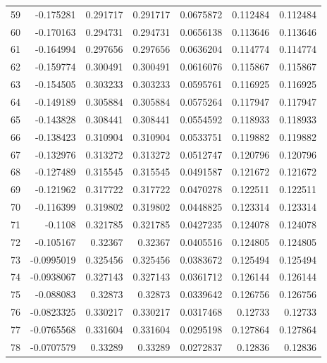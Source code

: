 \begin{tabular}{rrrrrrr}
  59 & -0.175281    & 0.291717    & 0.291717    &  0.0675872   & 0.112484    & 0.112484    \\
  60 & -0.170163    & 0.294731    & 0.294731    &  0.0656138   & 0.113646    & 0.113646    \\
  61 & -0.164994    & 0.297656    & 0.297656    &  0.0636204   & 0.114774    & 0.114774    \\
  62 & -0.159774    & 0.300491    & 0.300491    &  0.0616076   & 0.115867    & 0.115867    \\
  63 & -0.154505    & 0.303233    & 0.303233    &  0.0595761   & 0.116925    & 0.116925    \\
  64 & -0.149189    & 0.305884    & 0.305884    &  0.0575264   & 0.117947    & 0.117947    \\
  65 & -0.143828    & 0.308441    & 0.308441    &  0.0554592   & 0.118933    & 0.118933    \\
  66 & -0.138423    & 0.310904    & 0.310904    &  0.0533751   & 0.119882    & 0.119882    \\
  67 & -0.132976    & 0.313272    & 0.313272    &  0.0512747   & 0.120796    & 0.120796    \\
  68 & -0.127489    & 0.315545    & 0.315545    &  0.0491587   & 0.121672    & 0.121672    \\
  69 & -0.121962    & 0.317722    & 0.317722    &  0.0470278   & 0.122511    & 0.122511    \\
  70 & -0.116399    & 0.319802    & 0.319802    &  0.0448825   & 0.123314    & 0.123314    \\
  71 & -0.1108      & 0.321785    & 0.321785    &  0.0427235   & 0.124078    & 0.124078    \\
  72 & -0.105167    & 0.32367     & 0.32367     &  0.0405516   & 0.124805    & 0.124805    \\
  73 & -0.0995019   & 0.325456    & 0.325456    &  0.0383672   & 0.125494    & 0.125494    \\
  74 & -0.0938067   & 0.327143    & 0.327143    &  0.0361712   & 0.126144    & 0.126144    \\
  75 & -0.088083    & 0.32873     & 0.32873     &  0.0339642   & 0.126756    & 0.126756    \\
  76 & -0.0823325   & 0.330217    & 0.330217    &  0.0317468   & 0.12733     & 0.12733     \\
  77 & -0.0765568   & 0.331604    & 0.331604    &  0.0295198   & 0.127864    & 0.127864    \\
  78 & -0.0707579   & 0.33289     & 0.33289     &  0.0272837   & 0.12836     & 0.12836     \\

\end{tabular}
